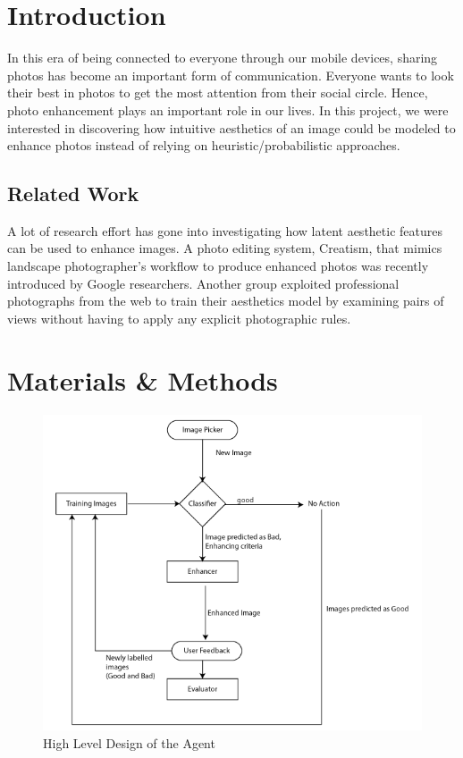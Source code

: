 \section{Introduction}
In this era of being connected to everyone through our mobile devices, sharing photos has become an important form of communication. Everyone wants to look their best in photos to get the most attention from their social circle. Hence, photo enhancement plays an important role in our lives. In this project, we were interested in discovering how intuitive aesthetics of an image could be modeled to enhance photos instead of relying on heuristic/probabilistic approaches.  

\subsection{Related Work}
A lot of research effort has gone into investigating how latent aesthetic features can be used to enhance images. A photo editing system, Creatism, that mimics landscape photographer's workflow to produce enhanced photos \cite{DBLP:journals/corr/FangZ17} was recently introduced by Google researchers. Another group \cite{DBLP:journals/corr/ChenKSCM17}  exploited professional photographs from the web to train their aesthetics model by examining pairs of views without having to apply any explicit photographic rules. 

\section{Materials \& Methods}
\begin{figure}[!h]
  \includegraphics[scale=0.4]{AgentDesign.png}
\caption{High Level Design of the Agent}
\label{fig:1}       
\end{figure}
\label{sec:1}
